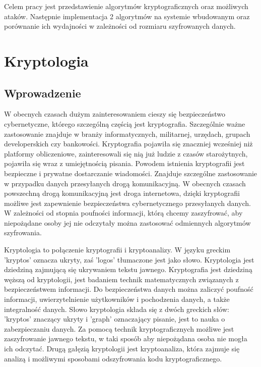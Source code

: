 \documentclass[12p]{report}
\begin{document}
\tableofcontents
\newpage
\quad Celem pracy jest przedstawienie algorytmów kryptograficznych oraz możliwych ataków. Następnie implementacja 2 algorytmów na systemie wbudowanym oraz porównanie ich wydajności w zależności od rozmiaru szyfrowanych danych.
\newpage


\chapter{Kryptologia}
\section{Wprowadzenie}

\quad W obecnych czasach dużym zainteresowaniem cieszy się bezpieczeństwo cybernetyczne, którego szczególną częścią jest kryptografia. Szczególnie ważne zastosowanie znajduje w branży informatycznych, militarnej, urzędach, grupach developerskich czy bankowości. Kryptografia pojawiła się znaczniej wcześniej niż platformy obliczeniowe, zainteresowali się nią już ludzie z czasów starożytnych, pojawiła się wraz z umiejętnością pisania. Powodem istnienia kryptografii jest bezpieczne i prywatne dostarczanie wiadomości. Znajduje szczególne zastosowanie w przypadku danych przesyłanych drogą komunikacyjną. W obecnych czasach powszechną drogą komunikacyjną jest droga internetowa, dzięki kryptografii możliwe jest zapewnienie bezpieczeństwa cybernetycznego przesyłanych danych. W zależności od stopnia poufności informacji, którą chcemy zaszyfrować, aby niepożądane osoby jej nie odczytały można zastosować odmiennych algorytmów szyfrowania. 

\quad Kryptologia to połączenie kryptografii i kryptoanalizy. W języku greckim 'kryptos' oznacza ukryty, zaś 'logos' tłumaczone jest jako słowo. Kryptologia jest dziedziną zajmującą się ukrywaniem tekstu jawnego. Kryptografia jest dziedziną węższą od kryptologii, jest badaniem technik matematycznych związanych z bezpieczeństwem informacji. Do bezpieczeństwa danych można zaliczyć poufność informacji, uwierzytelnienie użytkowników i pochodzenia danych, a także integralność danych. Słowo kryptologia składa się z dwóch greckich słów: 'kryptos' znaczący ukryty i 'graph' oznaczający pisanie, jest to nauka o zabezpieczaniu danych. Za pomocą technik kryptograficznych możliwe jest zaszyfrowanie jawnego tekstu, w taki sposób aby niepożądana osoba nie mogła ich odczytać. Drugą gałęzią kryptologii jest kryptoanaliza, która zajmuje się analizą i możliwymi sposobami odszyfrowania kodu kryptograficznego.
\end{document}
